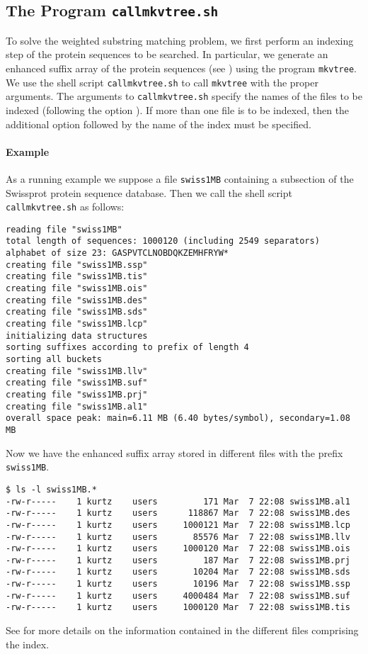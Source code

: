 \documentclass[12pt]{article}
\newcommand{\Mkvtree}[0]{{\small \texttt{mkvtree}}\xspace}
\newcommand{\Showfile}[1]{{\small \texttt{#1}}}
\newcommand{\WSMP}{weighted substring matching problem\xspace}
\begin{document}
\subsection{The Program \texttt{callmkvtree.sh}}
To solve the \WSMP, we first perform
an indexing step of the protein sequences to be searched. In 
particular, we generate an enhanced suffix array of the protein sequences
(see \cite{ABO:KUR:OHL:2002}) using the program \Mkvtree.
We use the shell script \Showfile{callmkvtree.sh} to call \Mkvtree with the
proper arguments. The arguments to \Showfile{callmkvtree.sh} specify the
names of the files to be indexed (following the option ). If 
more than one file is to be indexed, then the additional 
option  followed by the name of the index must be 
specified.

\paragraph{Example}
As a running example we suppose a file \Showfile{swiss1MB} containing a 
subsection of the Swissprot protein sequence database.
Then we call the shell script \Showfile{callmkvtree.sh} as follows:

\begin{footnotesize}
\begin{verbatim}
reading file "swiss1MB"
total length of sequences: 1000120 (including 2549 separators)
alphabet of size 23: GASPVTCLNOBDQKZEMHFRYW*
creating file "swiss1MB.ssp"
creating file "swiss1MB.tis"
creating file "swiss1MB.ois"
creating file "swiss1MB.des"
creating file "swiss1MB.sds"
creating file "swiss1MB.lcp"
initializing data structures
sorting suffixes according to prefix of length 4
sorting all buckets
creating file "swiss1MB.llv"
creating file "swiss1MB.suf"
creating file "swiss1MB.prj"
creating file "swiss1MB.al1"
overall space peak: main=6.11 MB (6.40 bytes/symbol), secondary=1.08 MB
\end{verbatim}
\end{footnotesize}

Now we have the enhanced suffix array stored in different files
with the prefix \Showfile{swiss1MB}.

\begin{small}
\begin{verbatim}
$ ls -l swiss1MB.*
-rw-r-----    1 kurtz    users         171 Mar  7 22:08 swiss1MB.al1
-rw-r-----    1 kurtz    users      118867 Mar  7 22:08 swiss1MB.des
-rw-r-----    1 kurtz    users     1000121 Mar  7 22:08 swiss1MB.lcp
-rw-r-----    1 kurtz    users       85576 Mar  7 22:08 swiss1MB.llv
-rw-r-----    1 kurtz    users     1000120 Mar  7 22:08 swiss1MB.ois
-rw-r-----    1 kurtz    users         187 Mar  7 22:08 swiss1MB.prj
-rw-r-----    1 kurtz    users       10204 Mar  7 22:08 swiss1MB.sds
-rw-r-----    1 kurtz    users       10196 Mar  7 22:08 swiss1MB.ssp
-rw-r-----    1 kurtz    users     4000484 Mar  7 22:08 swiss1MB.suf
-rw-r-----    1 kurtz    users     1000120 Mar  7 22:08 swiss1MB.tis
\end{verbatim}
\end{small}
See \cite{KUR:2002A} for more details on the information contained in the 
different files comprising the index.
\end{document}

